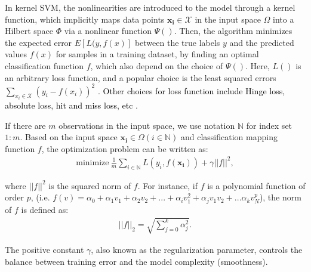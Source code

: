 In kernel SVM, the nonlinearities are introduced to the model through a kernel function, which implicitly maps data points $\mathbf{x_i} \in \mathcal{X}$ in the input space $\Omega$ into a Hilbert space $\Phi$ via a nonlinear function $\Psi()$\cite{aronszajn1950theory}. Then, the algorithm minimizes the expected error $E[L(y,f(x)]$ between the true labels $y$ and the predicted values $f(x)$ for samples in a training dataset, by finding an optimal classification function $f$, which also depend on the choice of $\Psi()$. Here, $L()$ is an arbitrary loss function, and a popular choice is the least squared errors $\sum\limits_{x_i \in \mathcal{X}} (y_i-f(x_i))^2$ \cite{scholkopf1999advances}. \textcolor{black}{Other choices for loss function include Hinge loss, absolute loss, hit and miss loss, etc \cite{weston1999support,masnadi2009design}}.

If there are $m$ observations in the input space, we use notation $\mathbb{N}$ for index set ${1:m}$. Based on the input space $\mathbf{x_i}\in \Omega (i\in \mathbb{N})$ and classification mapping function $f$, the optimization problem can be written as:
\begin{align}
    \text{minimize}~\frac{1}{m}\sum_{i\in \mathbb{N}}L(y_i,f(\mathbf{x_i})) + \gamma||f||^2,
    \label{eq:kernel}
\end{align}

where $||f||^2$ is the squared norm of $f$. For instance, if $f$ is a polynomial function of order $p$, (i.e. $f(v)=\alpha_0+\alpha_1 v_1+\alpha_2 v_2+...+ \alpha_i v_1^2 + \alpha_j v_1v_2+... \alpha_k v_N^p$), the norm of $f$ is defined as:  %
\begin{align}
	||f||_2 = \sqrt{\sum_{j=0}^{k} \alpha_j^2}.
\end{align}

The positive constant $\gamma$, also known as the regularization parameter, controls the balance between training error and the model complexity (smoothness).




